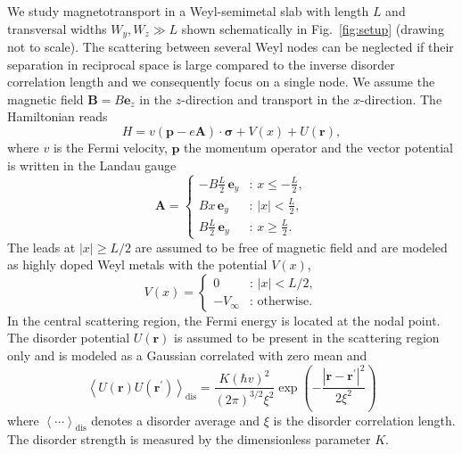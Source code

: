 \documentclass[aps,prb,10pt,amsmath,amssymb,twocolumn,floatfix,superscriptaddress,showpacs,numerical,footinbib]{revtex4-1}
\begin{document}
We study magnetotransport in a Weyl-semimetal slab with length $L$ and transversal widths $W_y, W_z \gg L$ shown schematically in Fig.~\ref{fig:setup} (drawing not to scale).
%
The scattering between several Weyl nodes can be neglected if their separation in reciprocal space is large compared to the inverse disorder correlation length and we consequently focus on a single node.
%
We assume the magnetic field $\mathbf{B}=B\mathbf{e}_{z}$
in the $z$-direction
and transport in the $x$-direction.
%
The Hamiltonian reads
\begin{equation}
H=v\left(\mathbf{p}-e\mathbf{A}\right)\cdot\boldsymbol{\sigma}+V\left(x\right)+U\left(\mathbf{r}\right),
\end{equation}
where $v$ is the Fermi velocity, $\mathbf{p}$ the momentum operator
and the vector potential is written in the Landau gauge
\begin{equation}
\mathbf{A}=\begin{cases}
-B\frac{L}{2}\,\mathbf{e}_{y} & :\,x\leq-\frac{L}{2},\\
Bx\,\mathbf{e}_{y} & :\,|x|<\frac{L}{2},\\
B\frac{L}{2}\,\mathbf{e}_{y} & :\,x\geq\frac{L}{2}.
\end{cases}
\label{eq:exactA-1}
\end{equation}
The leads at $|x|\geq L/2$ are assumed to be free of magnetic field and are modeled as highly doped Weyl metals with the potential
$V(x)$,
\begin{equation}
V(x)=\begin{cases}
0 & :\,|x|<L/2,\\
-V_{\infty} & :\,\mathrm{otherwise}.
\end{cases}
\end{equation}
In the central scattering region, the Fermi energy is located at the nodal point.
The disorder potential $U\left(\mathbf{r}\right)$ is assumed to be present in the scattering region only and is modeled as a Gaussian correlated with zero mean and
\begin{equation}
 \left\langle U(\mathbf{r})U(\mathbf{r}^{\prime})\right\rangle _\mathrm{dis}=\frac{K\left(\hbar v\right)^{2}}{(2\pi)^{3/2}\xi^{2}}\exp\left(-\frac{|\mathbf{r}-\mathbf{r}^{\prime}|^{2}}{2\xi^{2}}\right)
\label{eq:disorderCorrelator}
\end{equation}
where $\left\langle \cdots \right\rangle_\mathrm{dis}$ denotes a disorder average and $\xi$ is the disorder correlation length.
%
The disorder strength is measured by the dimensionless parameter $K$.
\end{document}
